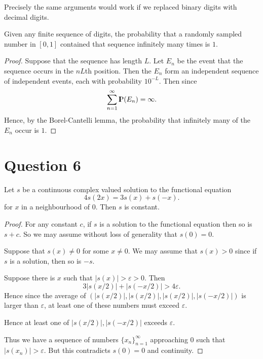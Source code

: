 \documentclass{unswmaths}
\begin{document}
\begin{remark}
    Precisely the same arguments would work if we replaced
    binary digits with decimal digits.
\end{remark}

\begin{theorem}
    Given any finite sequence of digits, the probability that a
    randomly sampled number in $[0,1]$
    contained that sequence infinitely many times is $1$.
\end{theorem}
\begin{proof}
    Suppose that the sequence has length $L$. Let $E_n$
    be the event that the sequence occurs in
    the $nL$th position. Then the $E_n$ form an independent sequence
    of independent events, each with probability $10^{-L}$. Then since
    \begin{equation*}
        \sum_{n=1}^\infty {\rm I\kern-.3em P}(E_n) = \infty.
    \end{equation*}
    Hence, by the Borel-Cantelli lemma, the probability that infinitely
    many of the $E_n$ occur is $1$.
\end{proof}

\section*{Question 6}

\begin{lemma}
\label{firstFunctional}
    Let $s$ be a continuous complex valued solution to the functional equation
    \begin{equation*}
        4s(2x) = 3s(x)+s(-x).
    \end{equation*}
    for $x$ in a neighbourhood of $0$.
    Then $s$ is constant.
\end{lemma}
\begin{proof}
    For any constant $c$, if $s$ is a solution to the functional
    equation then so is $s+c$. So we may assume without loss
    of generality that $s(0) = 0$.
    
    Suppose that $s(x) \neq 0$ for some $x \neq 0$. We may assume that $s(x) > 0$
    since if $s$ is a solution, then so is $-s$.
    
    Suppose there is $x$ such that $|s(x)| > \varepsilon > 0$. Then 
    \begin{equation*}
        3|s(x/2)|+|s(-x/2)| > 4\varepsilon. 
    \end{equation*}
    Hence since the average of $(|s(x/2)|,|s(x/2)|,|s(x/2)|,|s(-x/2)|)$
    is larger than $\varepsilon$, at least one of these numbers
    must exceed $\varepsilon$.
    
    Hence at least one of $|s(x/2)|,|s(-x/2)|$ exceeds $\varepsilon$. 
    
    Thus we have a sequence of numbers $\{x_n\}_{n=1}^\infty$ approaching $0$
    such that $|s(x_n)| > \varepsilon$. But this contradicts $s(0) = 0$
    and continuity.
\end{proof}
\end{document}
